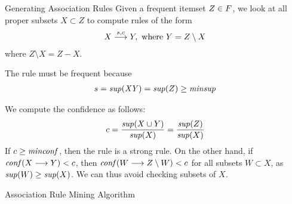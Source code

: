 \begin{frame}{Generating Association Rules}
Given a frequent itemset $Z \in {\relax F}$,
we look at all proper subsets
$X\subset Z$ to compute rules of the form
\begin{align*}
  X \arule{s,c} Y, \text{ where } Y = Z\setminus X
\end{align*}
where $Z \setminus X  = Z - X$.

\medskip
The rule must be frequent
because
\begin{align*}
s = \mathit{sup}(\mathit{XY}) = \mathit{sup}(Z) \geq \mathit{minsup}
\end{align*}

\medskip
We compute the conf\/{i}dence as follows:
\begin{align*}
c = \frac{\mathit{sup}(X \cup Y)}{\mathit{sup}(X)} = \frac{\mathit{sup}(Z)}{\mathit{sup}(X)}
\end{align*}
If $c \geq \mathit{minconf}$, then the rule is a strong rule. On the other
hand, if $\conff(X\arule Y) < c$, then
$\conff(W \arule Z \setminus W) < c$ for all subsets $W \subset X$,
as $\mathit{sup}(W) \ge \mathit{sup}(X)$. We can thus
avoid checking subsets of $X$.
\end{frame}


\begin{frame}[fragile]{Association Rule Mining Algorithm}
\begin{algorithm}[H]
\AlgoRuleMining{}
\end{algorithm}
\end{frame}
